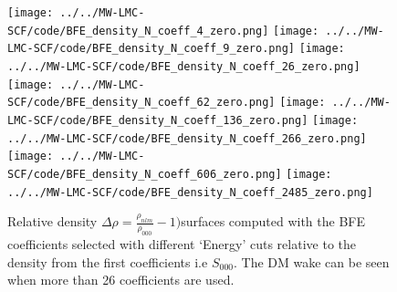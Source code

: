 \documentclass[14pt]{article}
\begin{document}
\begin{figure}[H]
 \centering
 \texttt{[image: ../../MW-LMC-SCF/code/BFE\_density\_N\_coeff\_4\_zero.png]}
 \texttt{[image: ../../MW-LMC-SCF/code/BFE\_density\_N\_coeff\_9\_zero.png]}
 \texttt{[image: ../../MW-LMC-SCF/code/BFE\_density\_N\_coeff\_26\_zero.png]}
  \texttt{[image: ../../MW-LMC-SCF/code/BFE\_density\_N\_coeff\_62\_zero.png]}
  \texttt{[image: ../../MW-LMC-SCF/code/BFE\_density\_N\_coeff\_136\_zero.png]}
  \texttt{[image: ../../MW-LMC-SCF/code/BFE\_density\_N\_coeff\_266\_zero.png]}
  \texttt{[image: ../../MW-LMC-SCF/code/BFE\_density\_N\_coeff\_606\_zero.png]}
  \texttt{[image: ../../MW-LMC-SCF/code/BFE\_density\_N\_coeff\_2485\_zero.png]}
  \caption{Relative density $\Delta \rho=\frac{\rho_{nlm}}{\rho_{000}}-1) $surfaces computed with the BFE coefficients selected with
  different `Energy' cuts relative to the density from the first coefficients
  i.e $S_{000}$. The DM wake can be seen when more than 26 coefficients are
  used.}
\end{figure}









\end{document}
